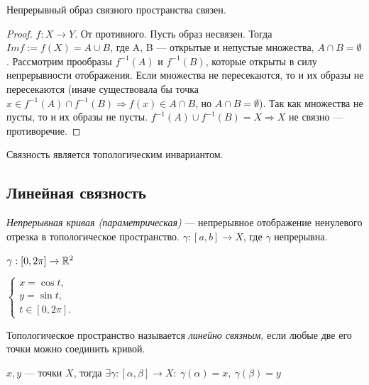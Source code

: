 \begin{statement}
    Непрерывный образ связного пространства связен.
\end{statement}
\begin{proof}
    $f: X \to Y$. От противного. Пусть образ несвязен. Тогда $Im f := f(X) = A \cup B$, где A, B — открытые и непустые множества, $A \cap B = \emptyset$. Рассмотрим прообразы $f^{-1}(A)$ и $f^{-1}(B)$, которые открыты в силу непрерывности отображения. Если множества не пересекаются, то и их образы не пересекаются (иначе существовала бы точка $x \in f^{-1}(A) \cap f^{-1}(B) \Longrightarrow f(x) \in A \cap B$, но $A \cap B = \emptyset$). Так как множества не пусты, то и их образы не пусты. $f^{-1}(A) \cup f^{-1}(B) = X \Longrightarrow X$ не связно — противоречие. 
\end{proof}

\begin{remark}
    Связность является топологическим инвариантом.
\end{remark}


\subsection{Линейная связность}
\begin{definition}
    \textit{Непрерывная кривая (параметрическая)} — непрерывное отображение ненулевого отрезка в топологическое пространство. $\gamma: [a,b] \to X$, где $\gamma$ непрерывна.
\end{definition}

\begin{example}
   $\gamma: [0, 2 \pi] \to \mathbb{R}^{2}$

    $\begin{cases}
        x = \cos{t}, \\
        y = \sin{t}, \\
        t \in [0, 2 \pi].
    \end{cases}$ 
\end{example}


\begin{definition}
    Топологическое пространство называется \textit{линейно связным}, если любые две его точки можно соединить кривой.
\end{definition}

\begin{example}
    $x, y$ — точки $X$, тогда $\exists \gamma: [\alpha, \beta] \to X: \ \gamma(\alpha) = x, \ \gamma(\beta) = y$
\end{example}

